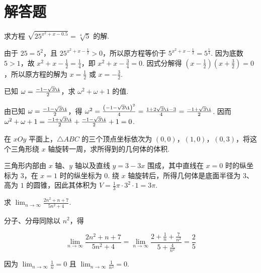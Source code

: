 \documentclass[UTF8,a4paper,oneside,11pt]{ctexbook}
\begin{document}
\section{解答题}

\begin{problem}
求方程 \(\sqrt{25^{x^2 + x - 0.5}} = \sqrt[4]{5}\) 的解.
\end{problem}

\begin{solution}
由于 \(25=5^2\)，且 \(25^{x^2+x-\frac{1}{2}}>0\)，所以原方程等价于 \(5^{x^2+x-\frac{1}{2}}=5^{\frac{1}{4}}\). 因为底数 \(5>1\)，故 \(x^2+x-\frac{1}{2}=\frac{1}{4}\)，即 \(x^2+x-\frac{3}{4}=0\). 因式分解得 \(\left(x-\frac{1}{2}\right)\left(x+\frac{3}{2}\right)=0\)，所以原方程的解为 \(x=\frac{1}{2}\) 或 \(x=-\frac{3}{2}\).
\end{solution}

\begin{problem}
已知 \(\omega = \frac{-1 - \sqrt{3}\i}{2}\)，求 \(\omega^2 + \omega + 1\) 的值.
\end{problem}

\begin{solution}
由已知 \(\omega=\frac{-1-\sqrt{3}\i}{2}\)，得 \(\omega^2=\frac{\left(-1-\sqrt{3}\i\right)^2}{4}=\frac{1+2\sqrt{3}\i-3}{4}=\frac{-1+\sqrt{3}\i}{2}\). 因而 \(\omega^2+\omega+1=\frac{-1+\sqrt{3}\i}{2}+\frac{-1-\sqrt{3}\i}{2}+1=0\).
\end{solution}

\begin{problem}
在 \(xOy\) 平面上，\(\triangle ABC\) 的三个顶点坐标依次为 \((0,0)\)，\((1,0)\)，\((0,3)\)，将这个三角形绕 \(x\) 轴旋转一周，求所得到的几何体的体积.
\end{problem}

\begin{solution}
三角形内部由 \(x\) 轴、\(y\) 轴以及直线 \(y=3-3x\) 围成，其中直线在 \(x=0\) 时的纵坐标为 \(3\)，在 \(x=1\) 时的纵坐标为 \(0\). 绕 \(x\) 轴旋转后，所得几何体是底面半径为 \(3\)、高为 \(1\) 的圆锥，因此其体积为 \(V=\frac{1}{3}\pi\cdot3^2\cdot1=3\pi\).
\end{solution}

\begin{problem}
求 \(\displaystyle\lim_{n\to\infty}\frac{2n^2 + n + 7}{5n^2 + 4}\).
\end{problem}

\begin{solution}
分子、分母同除以 \(n^2\)，得

\[
\displaystyle\lim_{n\to\infty}\frac{2n^2+n+7}{5n^2+4}=\displaystyle\lim_{n\to\infty}\frac{2+\frac{1}{n}+\frac{7}{n^2}}{5+\frac{4}{n^2}}=\frac{2}{5}
\]

因为 \(\displaystyle\lim_{n\to\infty}\frac{1}{n}=0\) 且 \(\displaystyle\lim_{n\to\infty}\frac{1}{n^2}=0\).
\end{solution}
\end{document}
